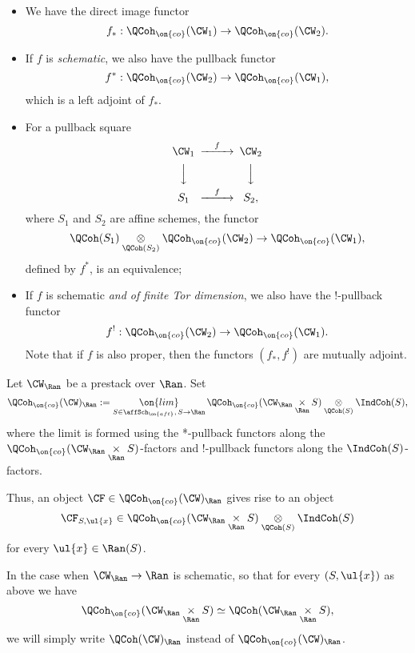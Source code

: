 \documentclass[9pt]{amsart}
\theoremstyle{remark}
\theoremstyle{definition}
\theoremstyle{remark}
\numberwithin{equation}{section}
\begin{document}
\begin{itemize}

\item We have the direct image functor 
$$f_*:\QCoh_{\on{co}}(\CW_1)\to \QCoh_{\on{co}}(\CW_2).$$

\item If $f$ is \emph{schematic}, we also have the pullback functor
$$f^*:\QCoh_{\on{co}}(\CW_2)\to \QCoh_{\on{co}}(\CW_1),$$
which is a left adjoint of $f_*$. 

\smallskip

\item For a pullback square 
$$
\CD
\CW_1 @>{f}>> \CW_2 \\
@VVV @VVV \\
S_1 @>{f}>> S_2,
\endCD
$$
where $S_1$ and $S_2$ are affine schemes, the functor
$$\QCoh(S_1)\underset{\QCoh(S_2)}\otimes \QCoh_{\on{co}}(\CW_2)\to \QCoh_{\on{co}}(\CW_1),$$
defined by $f^*$, is an equivalence;

\smallskip

\item If $f$ is schematic \emph{and of finite Tor dimension}, we also have the !-pullback functor
$$f^!:\QCoh_{\on{co}}(\CW_2)\to \QCoh_{\on{co}}(\CW_1).$$
Note that if $f$ is also proper, then the functors $(f_*,f^!)$ are mutually adjoint. 

\end{itemize}

\sssec{} \label{sss:iQCoh Ran}

Let $\CW_\Ran$ be a prestack over $\Ran$. Set
\begin{equation} \label{e:iQCoh rel}
\QCoh_{\on{co}}(\CW)_\Ran:=\underset{S\in \affSch_{\on{aft}},\,S\to \Ran}{\on{lim}}\, \QCoh_{\on{co}}(\CW_\Ran\underset{\Ran}\times S)\underset{\QCoh(S)}\otimes \IndCoh(S),
\end{equation} 
where the limit is formed using the *-pullback functors along the $\QCoh_{\on{co}}(\CW_\Ran\underset{\Ran}\times S)$-factors and 
!-pullback functors along the $\IndCoh(S)$-factors.

\medskip

Thus, an object $\CF\in \QCoh_{\on{co}}(\CW)_\Ran$ gives rise to an object
$$\CF_{S,\ul{x}}\in \QCoh_{\on{co}}(\CW_\Ran\underset{\Ran}\times S)\underset{\QCoh(S)}\otimes \IndCoh(S)$$
for every $\ul{x}\in \Ran(S)$. 

\medskip

In the case when $\CW_\Ran\to \Ran$ is schematic, so that for every $(S,\ul{x})$ as above we have 
$$\QCoh_{\on{co}}(\CW_\Ran\underset{\Ran}\times S)\simeq \QCoh(\CW_\Ran\underset{\Ran}\times S),$$ we will simply write 
$\QCoh(\CW)_\Ran$ instead of $\QCoh_{\on{co}}(\CW)_\Ran$. 
\end{document}
